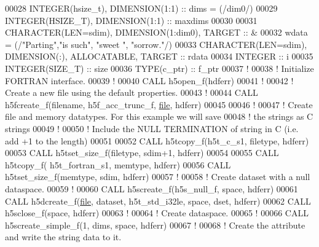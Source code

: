 \begin{DoxyCode}
00028   \textcolor{keywordtype}{INTEGER(hsize\_t)}, \textcolor{keywordtype}{DIMENSION(1:1)} :: dims = (/dim0/)
00029   \textcolor{keywordtype}{INTEGER(HSIZE\_T)}, \textcolor{keywordtype}{DIMENSION(1:1)} :: maxdims
00030   
00031   \textcolor{keywordtype}{CHARACTER(LEN=sdim)}, \textcolor{keywordtype}{DIMENSION(1:dim0)}, \textcolor{keywordtype}{TARGET} :: &
00032        wdata = (/\textcolor{stringliteral}{"Parting"},\textcolor{stringliteral}{"is such"}, \textcolor{stringliteral}{"sweet  "}, \textcolor{stringliteral}{"sorrow."}/)
00033   \textcolor{keywordtype}{CHARACTER(LEN=sdim)}, \textcolor{keywordtype}{DIMENSION(:)}, \textcolor{keywordtype}{ALLOCATABLE}, \textcolor{keywordtype}{TARGET} :: rdata
00034   \textcolor{keywordtype}{INTEGER} :: i
00035   \textcolor{keywordtype}{INTEGER(SIZE\_T)} :: size
00036   \textcolor{keywordtype}{TYPE}(c\_ptr) :: f\_ptr
00037   \textcolor{comment}{!}
00038   \textcolor{comment}{! Initialize FORTRAN interface.}
00039   \textcolor{comment}{!}
00040   \textcolor{keyword}{CALL }h5open\_f(hdferr)
00041   \textcolor{comment}{!}
00042   \textcolor{comment}{! Create a new file using the default properties.}
00043   \textcolor{comment}{!}
00044   \textcolor{keyword}{CALL }h5fcreate\_f(filename, h5f\_acc\_trunc\_f, \hyperlink{structfile}{file}, hdferr)
00045 
00046   \textcolor{comment}{!}
00047   \textcolor{comment}{! Create file and memory datatypes.  For this example we will save}
00048   \textcolor{comment}{! the strings as C strings}
00049   \textcolor{comment}{!}
00050   \textcolor{comment}{! Include the NULL TERMINATION of string in C (i.e. add +1 to the length)}
00051 
00052   \textcolor{keyword}{CALL }h5tcopy\_f(h5t\_c\_s1, filetype, hdferr)
00053   \textcolor{keyword}{CALL }h5tset\_size\_f(filetype, sdim+1, hdferr)
00054 
00055   \textcolor{keyword}{CALL }h5tcopy\_f( h5t\_fortran\_s1, memtype, hdferr)
00056   \textcolor{keyword}{CALL }h5tset\_size\_f(memtype, sdim, hdferr)
00057   \textcolor{comment}{!}
00058   \textcolor{comment}{! Create dataset with a null dataspace.}
00059   \textcolor{comment}{!}
00060   \textcolor{keyword}{CALL }h5screate\_f(h5s\_null\_f, space, hdferr)
00061   \textcolor{keyword}{CALL }h5dcreate\_f(\hyperlink{structfile}{file}, dataset, h5t\_std\_i32le, space, dset, hdferr)
00062   \textcolor{keyword}{CALL }h5sclose\_f(space, hdferr)
00063   \textcolor{comment}{!}
00064   \textcolor{comment}{! Create dataspace.}
00065   \textcolor{comment}{!}
00066   \textcolor{keyword}{CALL }h5screate\_simple\_f(1, dims, space, hdferr)
00067   \textcolor{comment}{!}
00068   \textcolor{comment}{! Create the attribute and write the string data to it.}

\end{DoxyCode}
